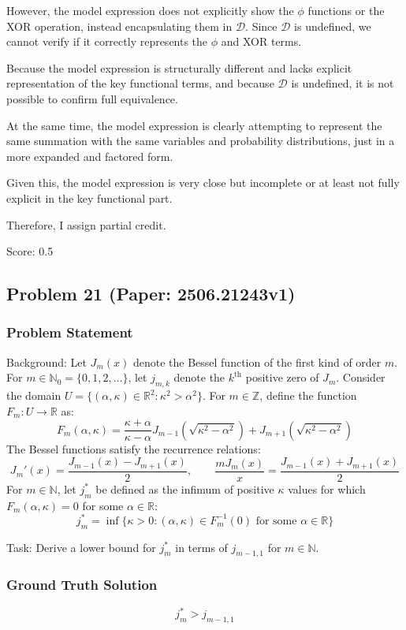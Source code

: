 \documentclass[10pt]{article}
\begin{document}
However, the model expression does not explicitly show the \(\phi\) functions or the XOR operation, instead encapsulating them in \(\mathcal{D}\). Since \(\mathcal{D}\) is undefined, we cannot verify if it correctly represents the \(\phi\) and XOR terms.

Because the model expression is structurally different and lacks explicit representation of the key functional terms, and because \(\mathcal{D}\) is undefined, it is not possible to confirm full equivalence.

At the same time, the model expression is clearly attempting to represent the same summation with the same variables and probability distributions, just in a more expanded and factored form.

Given this, the model expression is very close but incomplete or at least not fully explicit in the key functional part.

Therefore, I assign partial credit.

Score: 0.5

\newpage
\subsection*{Problem 21 (Paper: 2506.21243v1)}
\subsubsection*{Problem Statement}
Background:
Let $J_m(x)$ denote the Bessel function of the first kind of order $m$. For $m \in \mathbb{N}_0 = \{0,1,2,...\}$, let $j_{m,k}$ denote the $k^{\text{th}}$ positive zero of $J_m$.
Consider the domain $U = \{(\alpha,\kappa) \in \mathbb{R}^2 : \kappa^2 > \alpha^2\}$. For $m \in \mathbb{Z}$, define the function $F_m : U \to \mathbb{R}$ as:
$$ F_m(\alpha,\kappa) = \frac{\kappa+\alpha}{\kappa-\alpha}J_{m-1}(\sqrt{\kappa^2-\alpha^2}) + J_{m+1}(\sqrt{\kappa^2-\alpha^2}) $$
The Bessel functions satisfy the recurrence relations:
$$ J_m'(x) = \frac{J_{m-1}(x) - J_{m+1}(x)}{2}, \qquad \frac{m J_m(x)}{x} = \frac{J_{m-1}(x) + J_{m+1}(x)}{2} $$
For $m \in \mathbb{N}$, let $j^*_m$ be defined as the infimum of positive $\kappa$ values for which $F_m(\alpha,\kappa) = 0$ for some $\alpha \in \mathbb{R}$:
$$ j^*_m = \inf\{\kappa > 0 : (\alpha,\kappa) \in F_m^{-1}(0) \text{ for some } \alpha \in \mathbb{R} \} $$

Task:
Derive a lower bound for $j^*_m$ in terms of $j_{m-1,1}$ for $m \in \mathbb{N}$.

\subsubsection*{Ground Truth Solution}
\[ \boxed{j^*_m > j_{m-1,1}} \]
\end{document}
